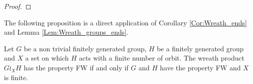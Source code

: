 \begin{lem}
\begin{proof}

\end{proof}
\end{lem}
%
%
The following proposition is a direct application of Corollary \ref{Cor:Wreath_ends} and Lemma \ref{Lem:Wreath_groups_ends}.
\begin{prop}
Let $G$ be a non trivial finitely generated group, $H$ be a finitely generated group and $X$ a set on which $H$ acts with a finite number of orbit. The wreath product $G \wr_X H$ has the property FW if and only if $G$ and $H$ have the property FW and $X$ is finite.
\end{prop}
%